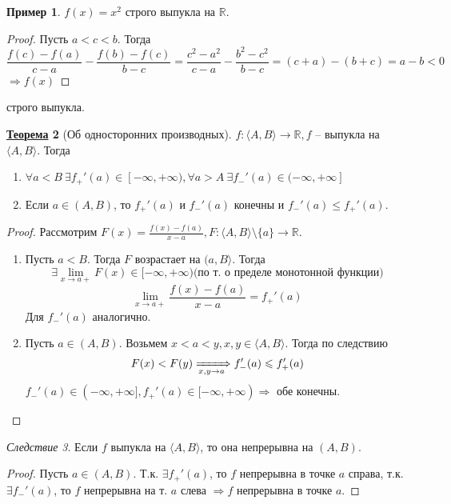 \documentclass[12pt]{article}
\newenvironment{MyList}[1][4pt]{
  \begin{enumerate}[1.]
  \setlength{\parskip}{0pt}
  \setlength{\itemsep}{#1}
}{       
  \end{enumerate}
}
\def\R{\mathbb{R}}       %
\def\SO{\Rightarrow}     %
\theoremstyle{definition} %
\newtheorem{Thm}{\underline{Теорема}}[subsection] %
\newtheorem{Example}[Thm]{Пример} %
\theoremstyle{plain} %
\theoremstyle{remark} %
\newtheorem{Cons}[Thm]{Следствие} %
\begin{document}
\begin{Example}
    $f(x) = x^2$ строго выпукла на $\R$.
\end{Example}

\begin{proof}
    Пусть $a < c < b$. Тогда 
    \[ \frac{f(c) - f(a)}{c - a} - \frac{f(b) - f(c)}{b - c} = \frac{c^2 - a^2}{c - a} - \frac{b^2 - c^2}{b - c} = (c + a) - (b + c) = a - b < 0\]
    $\SO f(x)$ 
\end{proof} строго выпукла.

\begin{Thm}[Об односторонних производных]
    $f : \langle A, B\rangle \to \R, f$ -- выпукла на $\langle A, B\rangle$. Тогда
    \begin{MyList}
        \item $\forall a < B \ \exists f_+'(a) \in [-\infty, +\infty), \forall a > A \ \exists f_-'(a) \in (-\infty, +\infty]$
        \item Если $a \in (A, B)$, то $f_+'(a)$ и $f_-'(a)$ конечны и $f_-'(a) \leqslant f_+'(a)$.
    \end{MyList}
\end{Thm}

\begin{proof}
    Рассмотрим $F(x) = \frac{f(x) - f(a)}{x - a}, F : \langle A, B\rangle \setminus \{a\} \to \R$.
    \begin{MyList}
        \item Пусть $a < B$. Тогда $F$ возрастает на $(a, B\rangle$. Тогда 
        \[\exists \lim_{x \to a+} F(x) \in [-\infty, +\infty) \text{(по т. о пределе монотонной функции)}\]
        \[\lim_{x \to a+} \frac{f(x) - f(a)}{x - a} = f_+'(a)\]
        Для $f_-'(a)$ аналогично.

        \item Пусть $a \in (A, B)$. Возьмем $x < a < y, x, y \in \langle A, B\rangle$. Тогда по следствию 
        \[F(x) < F(y) \xRightarrow[x, y \to a]{} f_-'(a) \leqslant f_+'(a)\]
        $f_-'(a) \in (-\infty, +\infty], f_+'(a) \in [-\infty, +\infty) \SO$ обе конечны. 
    \end{MyList}
\end{proof}

\begin{Cons}
    Если $f$ выпукла на $\langle A, B\rangle$, то она непрерывна на $(A, B)$.
\end{Cons}

\begin{proof}
    Пусть $a \in (A, B)$. Т.к. $\exists f_+'(a)$, то $f$ непрерывна в точке $a$ справа,
    т.к. $\exists f_-'(a)$, то $f$ непрерывна на т. $a$ слева $\SO f$ непрерывна в точке $a$. 
\end{proof}
\end{document}
